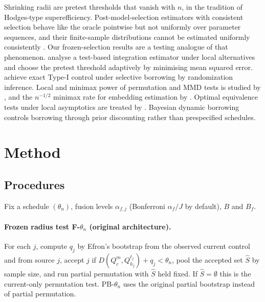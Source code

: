 \documentclass[11pt,a4paper]{article}
\begin{document}
Shrinking radii are pretest thresholds that vanish with $n$, in the tradition of Hodges-type superefficiency. Post-model-selection estimators with consistent selection behave like the oracle pointwise but not uniformly over parameter sequences, and their finite-sample distributions cannot be estimated uniformly consistently \citep{leeb2005}. Our frozen-selection results are a testing analogue of that phenomenon. \citet{yang2023elastic} analyse a test-based integration estimator under local alternatives and choose the pretest threshold adaptively by minimising mean squared error. \citet{zhu2025} achieve exact Type-I control under selective borrowing by randomization inference. Local and minimax power of permutation and MMD tests is studied by \citet{kim2022}, and the $n^{-1/2}$ minimax rate for embedding estimation by \citet{tolstikhin2017}. Optimal equivalence tests under local asymptotics are treated by \citet{romano2005}. Bayesian dynamic borrowing \citep{ibrahimchen2000,hobbs2011,schmidli2014,kaizer2018,viele2014} controls borrowing through prior discounting rather than prespecified schedules.

\section{Method}\label{sec:method}

\subsection{Procedures}\label{sec:procs}

Fix a schedule $(\theta_n)$, fusion levels $\alpha_{f,j}$ (Bonferroni $\alpha_f/J$ by default), $B$ and $B_f$.

\paragraph{Frozen radius test F-$\theta_n$ (original architecture).} For each $j$, compute $q_j$ by Efron's bootstrap from the observed current control and from source $j$, accept $j$ if $D(Q_c^m,Q_{h_j}^{\ell_j})+q_j<\theta_n$, pool the accepted set $\hat S$ by sample size, and run partial permutation with $\hat S$ held fixed. If $\hat S=\emptyset$ this is the current-only permutation test. PB-$\theta_n$ uses the original partial bootstrap instead of partial permutation.
\end{document}
